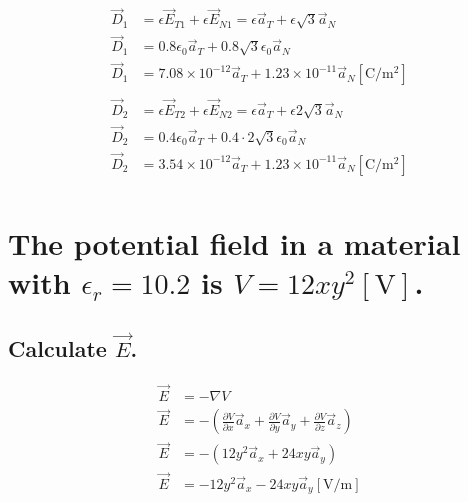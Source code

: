 \documentclass[14pt]{extarticle}
\begin{document}
\begin{align*}
	\vec{D}_1 & = \epsilon\vec{E}_{T1} + \epsilon\vec{E}_{N1} = \epsilon\vec{a}_{T} + \epsilon\sqrt{3}\vec{a}_{N}  \\
	\vec{D}_1 & = 0.8\epsilon_0\vec{a}_{T} + 0.8\sqrt{3}\epsilon_0\vec{a}_{N}                                      \\
	\vec{D}_1 & = 7.08\times10^{-12}\vec{a}_{T} + 1.23\times10^{-11}\vec{a}_{N}\mathrm{[C/m^2]}                    \\
	\\
	\vec{D}_2 & = \epsilon\vec{E}_{T2} + \epsilon\vec{E}_{N2} = \epsilon\vec{a}_{T} + \epsilon2\sqrt{3}\vec{a}_{N} \\
	\vec{D}_2 & = 0.4\epsilon_0\vec{a}_{T} + 0.4\cdot2\sqrt{3}\epsilon_0\vec{a}_{N}                                \\
	\vec{D}_2 & = 3.54\times10^{-12}\vec{a}_{T} + 1.23\times10^{-11}\vec{a}_{N}\mathrm{[C/m^2]}                    \\
\end{align*}

\boldmath
\section{The potential field in a material with $\epsilon_r=10.2$ is $V=12xy^2[\mathrm{V}]$.}
\unboldmath

\boldmath
\subsection{Calculate $\vec{E}$.}
\unboldmath

\begin{align*}
	\vec{E} & = -\nabla V                                                                                                                          \\
	\vec{E} & = -\left(\frac{\partial V}{\partial x}\vec{a}_x+\frac{\partial V}{\partial y}\vec{a}_y+\frac{\partial V}{\partial z}\vec{a}_z\right) \\
	\vec{E} & = -\left(12y^2\vec{a}_x+24xy\vec{a}_y\right)                                                                                         \\
	\vec{E} & = -12y^2\vec{a}_x-24xy\vec{a}_y\mathrm{[V/m]}                                                                                        \\
\end{align*}

\boldmath
\end{document}
